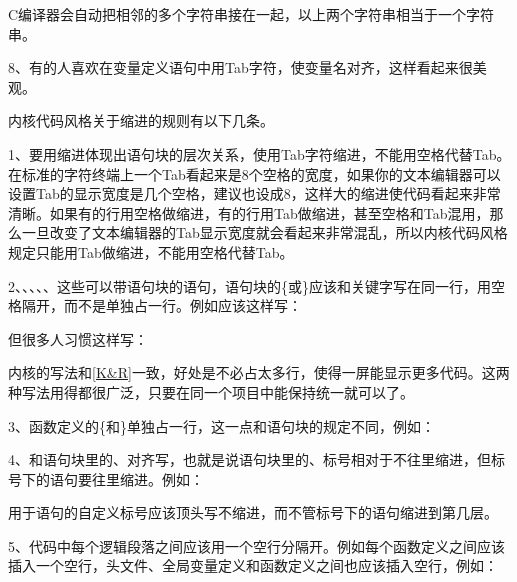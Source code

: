C编译器会自动把相邻的多个字符串接在一起，以上两个字符串相当于一个字符串。



8、有的人喜欢在变量定义语句中用Tab字符，使变量名对齐，这样看起来很美观。




内核代码风格关于缩进的规则有以下几条。



1、要用缩进体现出语句块的层次关系，使用Tab字符缩进，不能用空格代替Tab。在标准的字符终端上一个Tab看起来是8个空格的宽度，如果你的文本编辑器可以设置Tab的显示宽度是几个空格，建议也设成8，这样大的缩进使代码看起来非常清晰。如果有的行用空格做缩进，有的行用Tab做缩进，甚至空格和Tab混用，那么一旦改变了文本编辑器的Tab显示宽度就会看起来非常混乱，所以内核代码风格规定只能用Tab做缩进，不能用空格代替Tab。



2、、、、、这些可以带语句块的语句，语句块的\{或\}应该和关键字写在同一行，用空格隔开，而不是单独占一行。例如应该这样写：




但很多人习惯这样写：




内核的写法和\hyperlink{db.bi01.bibli.kr}{[K\&R]}一致，好处是不必占太多行，使得一屏能显示更多代码。这两种写法用得都很广泛，只要在同一个项目中能保持统一就可以了。



3、函数定义的\{和\}单独占一行，这一点和语句块的规定不同，例如：




4、和语句块里的、对齐写，也就是说语句块里的、标号相对于不往里缩进，但标号下的语句要往里缩进。例如：




用于语句的自定义标号应该顶头写不缩进，而不管标号下的语句缩进到第几层。



5、代码中每个逻辑段落之间应该用一个空行分隔开。例如每个函数定义之间应该插入一个空行，头文件、全局变量定义和函数定义之间也应该插入空行，例如：


